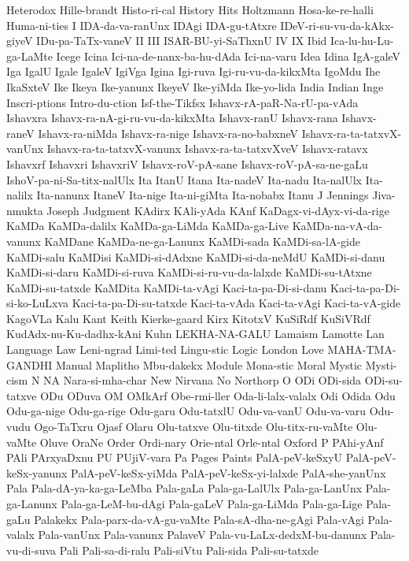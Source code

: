 {Heterodox
Hille-brandt
Histo-ri-cal
History
Hits
Holtzmann
Hosa-ke-re-halli
Huma-ni-ties
I
IDA-da-va-ranUnx
IDAgi
IDA-gu-tAtxre
IDeV-ri-su-vu-da-kAkx-giyeV
IDu-pa-TaTx-vaneV
II
III
ISAR-BU-yi-SaThxnU
IV
IX
Ibid
Ica-lu-hu-Lu-ga-LaMte
Icege
Icina
Ici-na-de-nanx-ba-hu-dAda
Ici-na-varu
Idea
Idina
IgA-galeV
Iga
IgalU
Igale
IgaleV
IgiVga
Igina
Igi-ruva
Igi-ru-vu-da-kikxMta
IgoMdu
Ihe
IkaSxteV
Ike
Ikeya
Ike-yanunx
IkeyeV
Ike-yiMda
Ike-yo-lida
India
Indian
Inge
Inscri-ptions
Intro-du-ction
Isf-the-Tikfsx
Ishavx-rA-paR-Na-rU-pa-vAda
Ishavxra
Ishavx-ra-nA-gi-ru-vu-da-kikxMta
Ishavx-ranU
Ishavx-rana
Ishavx-raneV
Ishavx-ra-niMda
Ishavx-ra-nige
Ishavx-ra-no-babxneV
Ishavx-ra-ta-tatxvX-vanUnx
Ishavx-ra-ta-tatxvX-vanunx
Ishavx-ra-ta-tatxvXveV
Ishavx-ratavx
Ishavxrf
Ishavxri
IshavxriV
Ishavx-roV-pA-sane
Ishavx-roV-pA-sa-ne-gaLu
IshoV-pa-ni-Sa-titx-nalUlx
Ita
ItanU
Itana
Ita-nadeV
Ita-nadu
Ita-nalUlx
Ita-nalilx
Ita-nanunx
ItaneV
Ita-nige
Ita-ni-giMta
Ita-nobabx
Itanu
J
Jennings
Jiva-nmukta
Joseph
Judgment
KAdirx
KAli-yAda
KAnf
KaDagx-vi-dAyx-vi-da-rige
KaMDa
KaMDa-dalilx
KaMDa-ga-LiMda
KaMDa-ga-Live
KaMDa-na-vA-da-vanunx
KaMDane
KaMDa-ne-ga-Lanunx
KaMDi-sada
KaMDi-sa-lA-gide
KaMDi-salu
KaMDisi
KaMDi-si-dAdxne
KaMDi-si-da-neMdU
KaMDi-si-danu
KaMDi-si-daru
KaMDi-si-ruva
KaMDi-si-ru-vu-da-lalxde
KaMDi-su-tAtxne
KaMDi-su-tatxde
KaMDita
KaMDi-ta-vAgi
Kaci-ta-pa-Di-si-danu
Kaci-ta-pa-Di-si-ko-LuLxva
Kaci-ta-pa-Di-su-tatxde
Kaci-ta-vAda
Kaci-ta-vAgi
Kaci-ta-vA-gide
KagoVLa
Kalu
Kant
Keith
Kierke-gaard
Kirx
KitotxV
KuSiRdf
KuSiVRdf
KudAdx-nu-Ku-dadhx-kAni
Kuhn
LEKHA-NA-GALU
Lamaism
Lamotte
Lan
Language
Law
Leni-ngrad
Limi-ted
Lingu-stic
Logic
London
Love
MAHA-TMA-GANDHI
Manual
Maplitho
Mbu-dakekx
Module
Mona-stic
Moral
Mystic
Mysti-cism
N
NA
Nara-si-mha-char
New
Nirvana
No
Northorp
O
ODi
ODi-sida
ODi-su-tatxve
ODu
ODuva
OM
OMkArf
Obe-rmi-ller
Oda-li-lalx-valalx
Odi
Odida
Odu
Odu-ga-nige
Odu-ga-rige
Odu-garu
Odu-tatxlU
Odu-va-vanU
Odu-va-varu
Odu-vudu
Ogo-TaTxru
Ojasf
Olaru
Olu-tatxve
Olu-titxde
Olu-titx-ru-vaMte
Olu-vaMte
Oluve
OraNe
Order
Ordi-nary
Orie-ntal
Orle-ntal
Oxford
P
PAhi-yAnf
PAli
PArxyaDxnu
PU
PUjiV-vara
Pa
Pages
Paints
PalA-peV-keSxyU
PalA-peV-keSx-yanunx
PalA-peV-keSx-yiMda
PalA-peV-keSx-yi-lalxde
PalA-she-yanUnx
Pala
Pala-dA-ya-ka-ga-LeMba
Pala-gaLa
Pala-ga-LalUlx
Pala-ga-LanUnx
Pala-ga-Lanunx
Pala-ga-LeM-bu-dAgi
Pala-gaLeV
Pala-ga-LiMda
Pala-ga-Lige
Pala-gaLu
Palakekx
Pala-parx-da-vA-gu-vaMte
Pala-sA-dha-ne-gAgi
Pala-vAgi
Pala-valalx
Pala-vanUnx
Pala-vanunx
PalaveV
Pala-vu-LaLx-dedxM-bu-danunx
Pala-vu-di-suva
Pali
Pali-sa-di-ralu
Pali-siVtu
Pali-sida
Pali-su-tatxde
}
